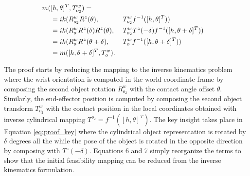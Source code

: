 \documentclass{aamas2015}
\begin{document}
\begin{alignat}{2}
  m(&[h,\theta]^T,T^w_{o_2}) 	=	\notag \\
				&= ik(R^w_{o_2} R^z(\theta), 			&&T^w_{o_2} f^{-1}([h,\theta]^T)) \\
				&= ik(R^w_o R^z(\delta) R^z(\theta), 		~&&T^w_{o_2} T^z(-\delta) f^{-1}([h,\theta+\delta]^T)) \label{eq:proof_key} \\
				&= ik(R^w_o R^z(\theta+\delta), 		&&T^w_o f^{-1}([h,\theta+\delta]^T)) \\
				&= m([h,\theta+\delta]^T, T^w_o). 				
\end{alignat}

The proof starts by reducing the mapping to the inverse kinematics problem where the wrist orientation is computed
in the world coordinate frame by composing the second object rotation $R^w_{o_2}$ with the contact angle offset $\theta$. Similarly,
the end-effector position is computed by composing the second object transform $T^w_{o_2}$ with the contact position
in the local coordinates obtained with inverse cylindrical mapping $T^{o_2} = f^{-1}([h,\theta]^T)$. The key
insight takes place in Equation \ref{eq:proof_key} where the cylindrical object representation is rotated by $\delta$
degrees all the while the pose of the object is rotated in the opposite direction by composing with
$T^z(-\delta)$. Equations 6 and 7 simply reorganize the terms to show that the initial feasibility
mapping can be reduced from the inverse kinematics formulation.
\end{document}
